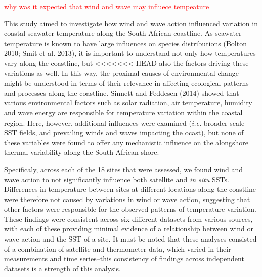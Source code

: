 \documentclass[12pt,A4paper,]{article}
\begin{document}
\textcolor{red}{why was it expected that wind and wave may influece tempeature}

This study aimed to investigate how wind and wave action influenced
variation in coastal seawater temperature along the South African
coastline. As seawater temperature is known to have large influences on
species distributions (Bolton 2010; Smit et al. 2013), it is important
to understand not only how temperatures vary along the coastline, but
<<<<<<< HEAD
also the factors driving these variations as well. In this way, the
proximal causes of environmental change might be understood in terms of
their relevance in affecting ecological patterns and processes along the
coastline. Sinnett and Feddesen (2014) showed that various environmental
factors such as solar radiation, air temperature, humidity and wave
energy are responsible for temperature variation within the coastal
region. Here, however, additional influences were examined (\emph{i.e.}
broader-scale SST fields, and prevailing winds and waves impacting the
ocast), but none of these variables were found to offer any mechanistic
influence on the alongshore thermal variability along the South African
shore.

Specificaly, across each of the 18 sites that were assessed, we found
wind and wave action to not significantly influence both satellite and
\emph{in situ} SSTs. Differences in temperature between sites at
different locations along the coastline were therefore not caused by
variations in wind or wave action, suggesting that other factors were
responsible for the observed patterns of temperature variation. These
findings were consistent across six different datasets from various
sources, with each of these providing minimal evidence of a relationship
between wind or wave action and the SST of a site. It must be noted that
these analyses consisted of a combination of satellite and thermometer
data, which varied in their measurements and time series--this
consistency of findings across independent datasets is a strength of
this analysis.
\end{document}
